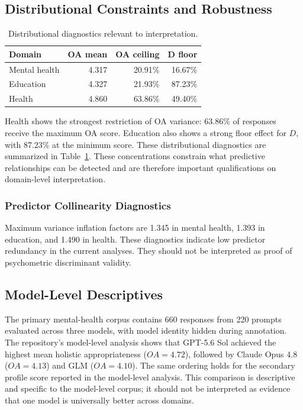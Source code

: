 \documentclass[manuscript,review,anonymous]{acmart}
\begin{document}
\subsection{Distributional Constraints and Robustness}

\begin{table}[t]
\centering
\caption{Distributional diagnostics relevant to interpretation.}
\label{tab:ceiling}
\begin{tabular}{lrrr}
\toprule
Domain & OA mean & OA ceiling & D floor\\
\midrule
Mental health & 4.317 & 20.91\% & 16.67\%\\
Education & 4.327 & 21.93\% & 87.23\%\\
Health & 4.860 & 63.86\% & 49.40\%\\
\bottomrule
\end{tabular}
\end{table}

Health shows the strongest restriction of OA variance: 63.86\% of responses receive the maximum OA score. Education also shows a strong floor effect for $D$, with 87.23\% at the minimum score. These distributional diagnostics are summarized in Table~\ref{tab:ceiling}. These concentrations constrain what predictive relationships can be detected and are therefore important qualifications on domain-level interpretation.

\subsubsection{Predictor Collinearity Diagnostics}

Maximum variance inflation factors are 1.345 in mental health, 1.393 in education, and 1.490 in health. These diagnostics indicate low predictor redundancy in the current analyses. They should not be interpreted as proof of psychometric discriminant validity.

\subsection{Model-Level Descriptives}

The primary mental-health corpus contains 660 responses from 220 prompts evaluated across three models, with model identity hidden during annotation. The repository's model-level analysis shows that GPT-5.6 Sol achieved the highest mean holistic appropriateness ($OA=4.72$), followed by Claude Opus 4.8 ($OA=4.13$) and GLM ($OA=4.10$). The same ordering holds for the secondary profile score reported in the model-level analysis. This comparison is descriptive and specific to the model-level corpus; it should not be interpreted as evidence that one model is universally better across domains.
\end{document}
